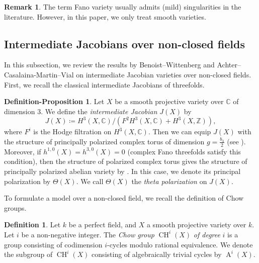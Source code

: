 \documentclass[autodetect-engine, a4paper]{amsart}
\theoremstyle{definition}
\newtheorem{defn-prop}[thm]{Definition-Proposition}
\newtheorem{rem}[thm]{Remark}
\newtheorem{defn}[thm]{Definition}
\def\C{{\mathbb C}}
\def\Z{{\mathbb Z}}
\DeclareMathOperator\CH{\mathrm{CH}}
\DeclareMathOperator\A{\mathrm{A}}
\begin{document}
\begin{rem}
The term Fano variety usually admits (mild) singularities in the literature.
However, in this paper, we only treat smooth varieties.
\end{rem}





\subsection{Intermediate Jacobians over non-closed fields}
In this subsection, we review the results by Benoist--Wittenberg and Achter--Casalaina-Martin--Vial on intermediate Jacobian varieties over non-closed fields.
First, we recall the classical intermediate Jacobians of threefolds.

\begin{defn-prop}
Let $X$ be a smooth projective variety over $\C$ of dimension $3$.
We define the \emph{intermediate Jacobian} $J(X)$ by
\[
J(X) \coloneqq H^3(X,\C)/(F^2 H^3(X,\C) + H^3(X,\Z)),
\]
where $F^i$ is the Hodge filtration on $H^3(X,\C)$.
Then we can equip $J(X)$ with the structure of principally polarized complex torus of dimension $g = \frac{b_{3}}{2}$ (see \cite[Definition 3.5]{Clemens-Griffiths}). 
Moreover, if $h^{1,0} (X) = h^{3,0} (X)=0$ (complex Fano threefolds satisfy this condition), then the structure of polarized complex torus gives the structure of principally polarized abelian variety by \cite[Lemma 3.4]{Clemens-Griffiths}. 
 In this case, we denote its principal polarization by $\Theta (X)$. We call $\Theta (X)$ the \emph{theta polarization} on $J(X)$.
\end{defn-prop}


To formulate a model over a non-closed field, we recall the definition of Chow groups.


\begin{defn}
\label{defn:ChowandA}
Let $k$ be a perfect field, and $X$ a smooth projective variety over $k$.
Let $i$ be a non-negative integer.
The \emph{Chow group} $\CH^i(X)$ \emph{of degree} $i$ is a group consisting of codimension $i$-cycles modulo rational equivalence.
We denote the subgroup of $\CH^i(X)$ consisting of algebraically trivial cycles by $\A^i(X).$
\end{defn}
\end{document}
